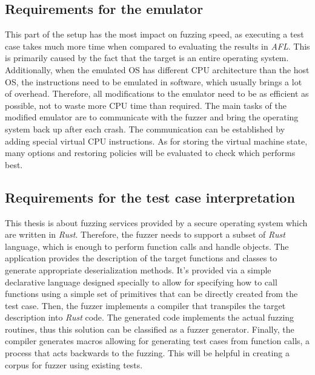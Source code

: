 \subsection{Requirements for the emulator}
This part of the setup has the most impact on fuzzing speed, as executing a test case takes much more time when compared to evaluating the results in \textit{AFL}. This is primarily caused by the fact that the target is an entire operating system. Additionally, when the emulated OS has different CPU architecture than the host OS, the instructions need to be emulated in software, which usually brings a lot of overhead. Therefore, all modifications to the emulator need to be as efficient as possible, not to waste more CPU time than required. The main tasks of the modified emulator are to communicate with the fuzzer and bring the operating system back up after each crash. The communication can be established by adding special virtual CPU instructions. As for storing the virtual machine state, many options and restoring policies will be evaluated to check which performs best.

\subsection{Requirements for the test case interpretation}
This thesis is about fuzzing services provided by a secure operating system which are written in \textit{Rust}. Therefore, the fuzzer needs to support a subset of \textit{Rust} language, which is enough to perform function calls and handle objects. The application provides the description of the target functions and classes to generate appropriate deserialization methods. It's provided via a simple declarative language designed specially to allow for specifying how to call functions using a simple set of primitives that can be directly created from the test case. Then, the fuzzer implements a compiler that transpiles the target description into \textit{Rust} code. The generated code implements the actual fuzzing routines, thus this solution can be classified as a fuzzer generator. Finally, the compiler generates macros allowing for generating test cases from function calls, a process that acts backwards to the fuzzing. This will be helpful in creating a corpus for fuzzer using existing tests. 

